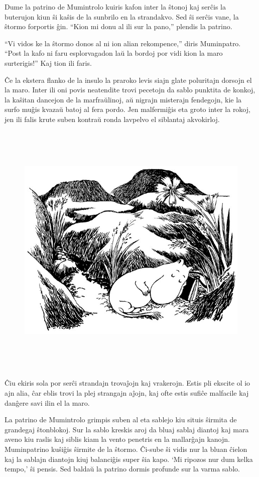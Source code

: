 Dume la patrino de Mumintrolo kuiris kafon inter la ŝtonoj kaj serĉis la buterujon kiun ŝi kaŝis de la sunbrilo en la strandakvo. Sed ŝi serĉis vane, la ŝtormo forportis ĝin. ``Kion mi donu al ili sur la pano,'' plendis la patrino.

``Vi vidos ke la ŝtormo donos al ni ion alian rekompence,'' diris Muminpatro. ``Post la kafo ni faru esplorvagadon laŭ la bordoj por vidi kion la maro surterigis!'' Kaj tion ili faris.

Ĉe la ekstera flanko de la insulo la praroko levis siajn glate poluritajn dorsojn el la maro. Inter ili oni povis neatendite trovi pecetojn da sablo punktita de konkoj, la kaŝitan dancejon de la marfraŭlinoj, aŭ nigrajn misterajn fendegojn, kie la surfo muĝis kvazaŭ batoj al fera pordo. Jen malfermiĝis eta groto inter la rokoj, jen ili falis krute suben kontraŭ ronda lavpelvo el siblantaj akvokirloj.

\begin{figure}[htbp]
\centering
\includegraphics[width=449pt,height=355pt]{_19.jpg}
\caption{}
\label{_19}
\end{figure}

Ĉiu ekiris sola por serĉi strandajn trovaĵojn kaj vrakerojn. Estis pli ekscite ol io ajn alia, ĉar eblis trovi la plej strangajn aĵojn, kaj ofte estis sufiĉe malfacile kaj danĝere savi ilin el la maro.

La patrino de Mumintrolo grimpis suben al eta sablejo kiu situis ŝirmita de grandegaj ŝtonblokoj. Sur la sablo kreskis aroj da bluaj sablaj diantoj kaj mara aveno kiu raslis kaj siblis kiam la vento penetris en la mallarĝajn kanojn. Muminpatrino kuŝiĝis ŝirmite de la ŝtormo. Ĉi-sube ŝi vidis nur la bluan ĉielon kaj la sablajn diantojn kiuj balanciĝis super ŝia kapo. `Mi ripozos nur dum kelka tempo,' ŝi pensis. Sed baldaŭ la patrino dormis profunde sur la varma sablo.

